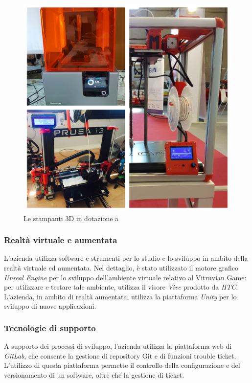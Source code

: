 \begin{figure}[H]
	\begin{center}
	\includegraphics[scale=0.07]{immagini/stampanti.jpg}
	\caption{Le stampanti 3D in dotazione a \lab{}}
	\end{center}
\end{figure}

\subsubsection{Realtà virtuale e aumentata}
L'azienda utilizza software e strumenti per lo studio e lo sviluppo in ambito della realtà virtuale ed aumentata.
Nel dettaglio, è stato utilizzato il motore grafico \textit{Unreal Engine} per lo sviluppo dell'ambiente virtuale relativo al Vitruvian Game: per utilizzare e testare tale ambiente, \lab{} utilizza il visore \textit{Vive} prodotto da \textit{HTC}.\\
L'azienda, in ambito di realtà aumentata, utilizza la piattaforma \textit{Unity} per lo sviluppo di nuove applicazioni.\\

\subsubsection{Tecnologie di supporto}
A supporto dei processi di sviluppo, l'azienda utilizza la piattaforma web di \textit{GitLab}, che consente la gestione di repository Git e di funzioni trouble ticket.\\
L'utilizzo di questa piattaforma permette il controllo della configurazione e del versionamento di un software, oltre che la gestione di ticket.


